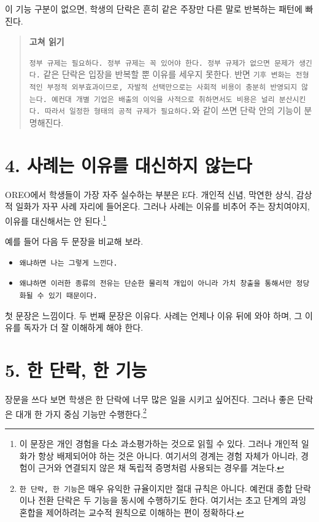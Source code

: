 이 기능 구분이 없으면, 학생의 단락은 흔히 같은 주장만 다른 말로 반복하는 패턴에 빠진다.

\begin{quote}
\textbf{고쳐 읽기}

\texttt{정부\ 규제는\ 필요하다.\ 정부\ 규제는\ 꼭\ 있어야\ 한다.\ 정부\ 규제가\ 없으면\ 문제가\ 생긴다.} 같은 단락은 입장을 반복할 뿐 이유를 세우지 못한다. 반면 \texttt{기후\ 변화는\ 전형적인\ 부정적\ 외부효과이므로,\ 자발적\ 선택만으로는\ 사회적\ 비용이\ 충분히\ 반영되지\ 않는다.\ 예컨대\ 개별\ 기업은\ 배출의\ 이익을\ 사적으로\ 취하면서도\ 비용은\ 널리\ 분산시킨다.\ 따라서\ 일정한\ 형태의\ 공적\ 규제가\ 필요하다.}와 같이 쓰면 단락 안의 기능이 분명해진다.
\end{quote}

\section{4. 사례는 이유를 대신하지 않는다}\label{4-uxc0acuxb840uxb294-uxc774uxc720uxb97c-uxb300uxc2e0uxd558uxc9c0-uxc54auxb294uxb2e4}

OREO에서 학생들이 가장 자주 실수하는 부분은 E다. 개인적 신념, 막연한 상식, 감상적 일화가 자꾸 사례 자리에 들어온다. 그러나 사례는 이유를 비추어 주는 장치여야지, 이유를 대신해서는 안 된다.\footnote{이 문장은 개인 경험을 다소 과소평가하는 것으로 읽힐 수 있다. 그러나 개인적 일화가 항상 배제되어야 하는 것은 아니다. 여기서의 경계는 경험 자체가 아니라, 경험이 근거와 연결되지 않은 채 독립적 증명처럼 사용되는 경우를 겨눈다.}

예를 들어 다음 두 문장을 비교해 보라.

\begin{itemize}
\tightlist
\item
  \texttt{왜냐하면\ 나는\ 그렇게\ 느낀다.}
\item
  \texttt{왜냐하면\ 이러한\ 종류의\ 전유는\ 단순한\ 물리적\ 개입이\ 아니라\ 가치\ 창출을\ 통해서만\ 정당화될\ 수\ 있기\ 때문이다.}
\end{itemize}

첫 문장은 느낌이다. 두 번째 문장은 이유다. 사례는 언제나 이유 뒤에 와야 하며, 그 이유를 독자가 더 잘 이해하게 해야 한다.

\section{5. 한 단락, 한 기능}\label{5-uxd55c-uxb2e8uxb77d-uxd55c-uxae30uxb2a5}

장문을 쓰다 보면 학생은 한 단락에 너무 많은 일을 시키고 싶어진다. 그러나 좋은 단락은 대개 한 가지 중심 기능만 수행한다.\footnote{\texttt{한\ 단락,\ 한\ 기능}은 매우 유익한 규율이지만 절대 규칙은 아니다. 예컨대 종합 단락이나 전환 단락은 두 기능을 동시에 수행하기도 한다. 여기서는 초고 단계의 과잉 혼합을 제어하려는 교수적 원칙으로 이해하는 편이 정확하다.}

